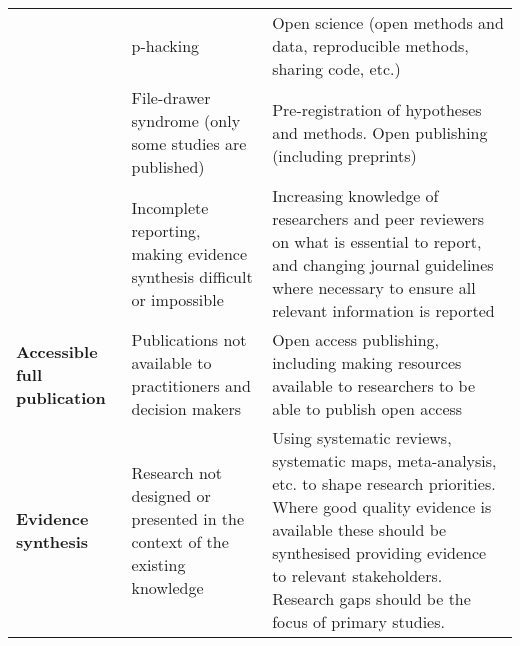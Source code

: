 \documentclass[]{article}
\begin{document}
\begin{tabular}{>{\bfseries}lll}
 & p-hacking & Open science (open methods and data, reproducible methods, sharing code, etc.)\\

 & File-drawer syndrome (only some studies are published) & Pre-registration of hypotheses and methods. Open publishing (including preprints)\\

\multirow{-5}{*}{\raggedright\arraybackslash Unbiased reporting} & Incomplete reporting, making evidence synthesis difficult or impossible & Increasing knowledge of researchers and peer reviewers on what is essential to report, and changing journal guidelines where necessary to ensure all relevant information is reported\\
\cmidrule{1-3}
Accessible full publication & Publications not available to practitioners and decision makers & Open access publishing, including making resources available to researchers to be able to publish open access\\
\cmidrule{1-3}
Evidence synthesis & Research not designed or presented in the context of the existing knowledge & Using systematic reviews, systematic maps, meta-analysis, etc. to shape research priorities. Where good quality evidence is available these should be synthesised providing evidence to relevant stakeholders. Research gaps should be the focus of primary studies.\\
\bottomrule
\end{tabular}
\end{document}

